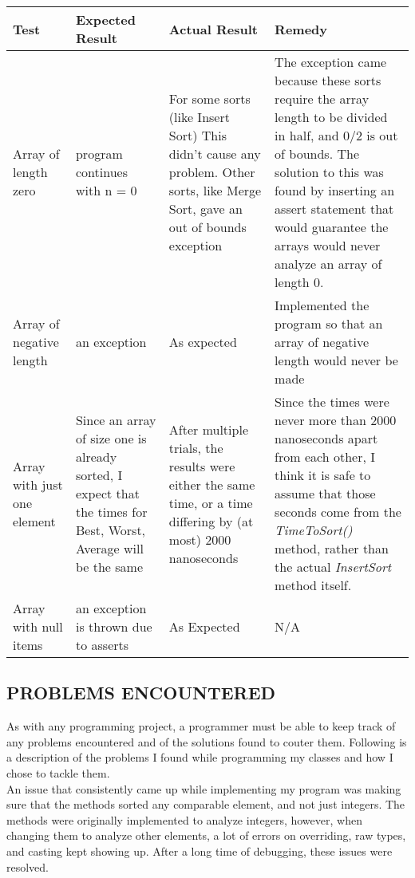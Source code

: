 \documentclass[12pt]{article}
\begin{document}
	
	\begin{tabular}{|p{3.5cm}|p{3.5cm}|p{3.5cm}|p{3.5cm}|}
	\hline
	Test & Expected Result & Actual Result & Remedy\\
	\hline
	Array of length zero  & program continues with n = 0 & For some sorts (like Insert Sort) This didn't cause any problem. Other sorts, like Merge Sort, gave an out of bounds exception & The exception came because these sorts require the array length to be divided in half, and 0/2 is out of bounds. The solution to this was found by inserting an assert statement that would guarantee the arrays would never analyze an array of length 0.\\
	\hline	
	Array of negative length & an exception & As expected & Implemented the program so that an array of negative length would never be made\\
	\hline
	Array with just one element  & Since an array of size one is already sorted, I expect that the times for Best, Worst, Average will be the same & After multiple trials, the results were either the same time, or a time differing by (at most) 2000 nanoseconds & Since the times were never more than 2000 nanoseconds apart from each other, I think it is safe to assume that those seconds come from the \textit{TimeToSort()} method, rather than the actual \textit{InsertSort} method itself. \\
	\hline
	Array with null items  & an exception is thrown due to asserts & As Expected & N/A \\
	\hline
	\end{tabular}
	
\subsection*{PROBLEMS ENCOUNTERED}

As with any programming project, a programmer must be able to keep track of any problems encountered and of the solutions found to couter them. Following is a description of the problems I found while programming my classes and how I chose to tackle them. \\

An issue that consistently came up while implementing my program was making sure that the methods sorted any comparable element, and not just integers. The methods were originally implemented to analyze integers, however, when changing them to analyze other elements, a lot of errors on overriding, raw types, and casting kept showing up. After a long time of debugging, these issues were resolved. \\
\end{document}

